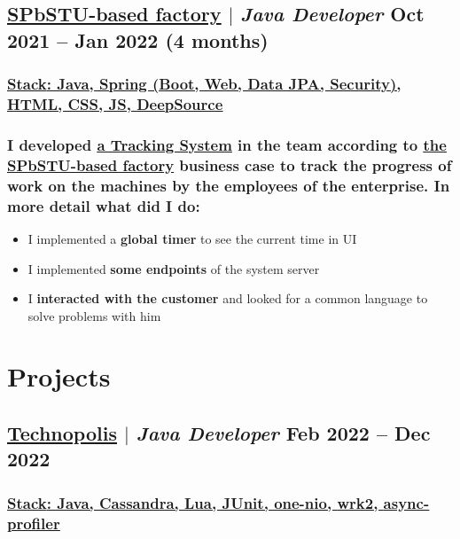 \documentclass[11pt]{article}
\begin{document}
\subsection{\href{https://www.spbstu.ru/}{\underline{SPbSTU-based factory}} $|$ {\normalfont\textit{Java Developer}} \hfill Oct 2021 -- Jan 2022 (4 months)}
\subsubsection{\underline{\textbf{Stack}: Java, Spring (Boot, Web, Data JPA, Security), HTML, CSS, JS, \href{https://deepsource.com/}{DeepSource}}}
\subsubsection{I developed \href{https://github.com/martyn-fanclub/tracking-system}{\underline{a Tracking System}} in the team according to \href{https://www.spbstu.ru/}{\underline{the SPbSTU-based factory}} business case to track the progress of work on the machines by the employees of the enterprise. In more detail what did I do:}
\begin{itemize}
    \item I implemented a \textbf{global timer} to see the current time in UI
    \item I implemented \textbf{some endpoints} of the system server
    \item I \textbf{interacted with the customer} and looked for a common language to solve problems with him
\end{itemize}

\section{Projects}
\subsection{\href{https://polis.vk.company/}{\underline{Technopolis}} $|$ {\normalfont\textit{Java Developer}} \hfill Feb 2022 -- Dec 2022}
\subsubsection{\underline{\textbf{Stack}: Java, Cassandra, Lua, JUnit, \href{https://github.com/odnoklassniki/one-nio}{one-nio}, \href{https://github.com/giltene/wrk2}{wrk2}, \href{https://github.com/async-profiler/async-profiler}{async-profiler}}}
\end{document}
